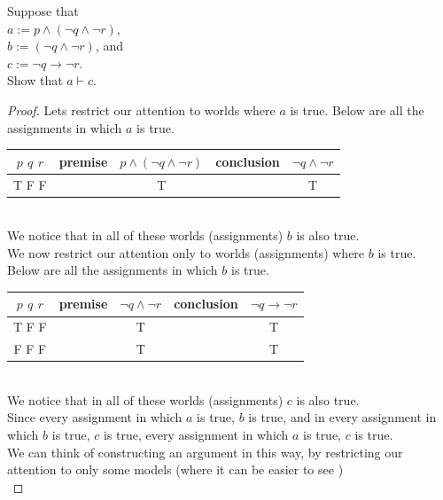 \begin{exmp}
Suppose that \\
$a :=p\land (\lnot q \land \lnot r)$,\\
$b:= (\lnot q \land \lnot r)$, and \\
$c:=\lnot q \to \lnot r$.\\
Show that
$a\vdash c$.
\begin{proof}
Lets restrict our attention to worlds where $a$ is true. Below are all the assignments in which $a$ is true.\\
\begin{tabular}{ | c | c | c |c |c |} 
  \hline
 $p$ $q$ $r$ & premise & $p \land (\lnot q \land \lnot r)$& conclusion & $\lnot q \land \lnot r$\\
 \hline
  T F F  &&T &&T\\ 
 \hline
\end{tabular}\\
We notice that in all of these worlds (assignments) $b$ is also true.\\
We now restrict our attention only to worlds (assignments) where $b$ is true.\\
Below are all the assignments in which $b$ is true.\\
\begin{tabular}{ | c | c | c |c |c |} 
  \hline
 $p$ $q$ $r$ & premise & $\lnot q \land \lnot r$& conclusion & $\lnot q \to \lnot r$\\
 \hline
  T F F  &&T &&T\\
  F F F  &&T &&T\\ 
 \hline
\end{tabular}\\
We notice that in all of these worlds (assignments) $c$ is also true.\\
Since every assignment in which $a$ is true, $b$ is true, and in every assignment in which $b$ is true, $c$ is true, every assignment in which $a$ is true, $c$ is true.\\
We can think of constructing an argument in this way, by restricting our attention to only some models (where it can be easier to see )\\


\end{proof}
\end{exmp}
